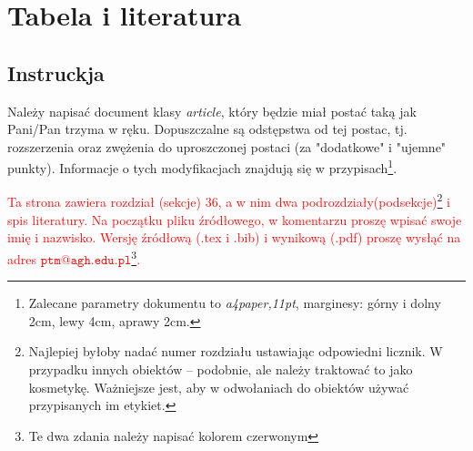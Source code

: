 \documentclass[a4paper, 11pt]{article}
\begin{document}
\pagestyle{fancy}
\section{Tabela i literatura}
\label{title}

\subsection{Instruckja}
Należy napisać document klasy {\em article}, który będzie miał postać taką jak Pani/Pan trzyma w ręku. Dopuszczalne są odstępstwa od tej postac, tj. rozszerzenia oraz zwężenia do uproszczonej postaci (za "dodatkowe" i "ujemne" punkty). Informacje o tych modyfikacjach znajdują się w przypisach\footnote{Zalecane parametry dokumentu to {\em a4paper,11pt}, marginesy: górny i dolny 2cm, lewy 4cm, aprawy 2cm.}.

\textcolor{red}{
Ta strona zawiera rozdział (sekcje) 36, a w nim dwa podrozdziały(podsekcje)\footnote{Najlepiej byłoby nadać numer rozdziału ustawiając odpowiedni licznik. W przypadku innych obiektów -- podobnie, ale należy traktować to jako kosmetykę. Ważniejsze jest, aby w odwołaniach do obiektów używać przypisanych im etykiet.} i spis literatury. Na początku pliku źródłowego, w komentarzu proszę wpisać swoje imię i nazwisko. Wersję źródłową (.tex i .bib) i wynikową (.pdf) proszę wysłąć na adres $\mathtt{ptm@agh.edu.pl}$\footnote{Te dwa zdania należy napisać kolorem czerwonym}.}
\end{document}
